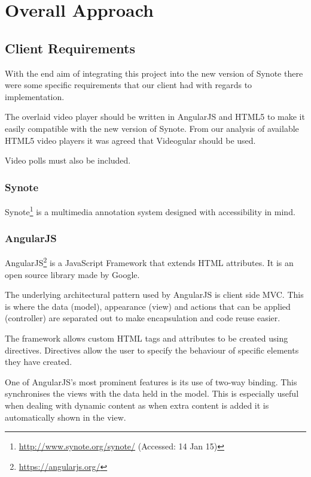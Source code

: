 \chapter{Overall Approach} 
\label{Chapter:Overall Approach}
\section{Client Requirements}
With the end aim of integrating this project into the new version of Synote there were some specific requirements that our client had with regards to implementation.

The overlaid video player should be written in AngularJS and HTML5 to make it easily compatible with the new version of Synote. From our analysis of available HTML5 video players it was agreed that \gls{Videogular} should be used.

Video polls must also be included.

\subsection{Synote}
\label{Section:Synote}
Synote\footnote{\url{http://www.synote.org/synote/} (Accessed: 14 Jan 15)} is a multimedia annotation system designed with accessibility in mind. 

\subsection{AngularJS}
\label{Section:AngularJS}
\gls{AngularJS}\footnote{\url{https://angularjs.org/}} is a JavaScript Framework that extends HTML attributes. It is an open source library made by Google.

The underlying architectural pattern used by \gls{AngularJS} is client side \gls{MVC}. This is where the data (model), appearance (view) and actions that can be applied (controller) are separated out to make encapsulation and code reuse easier. 

The framework allows custom HTML tags and attributes to be created using directives. Directives allow the user to specify the behaviour of specific elements they have created.

One of \gls{AngularJS}'s most prominent features is its use of two-way binding. This synchronises the views with the data held in the model. This is especially useful when dealing with dynamic content as when extra content is added it is automatically shown in the view.

